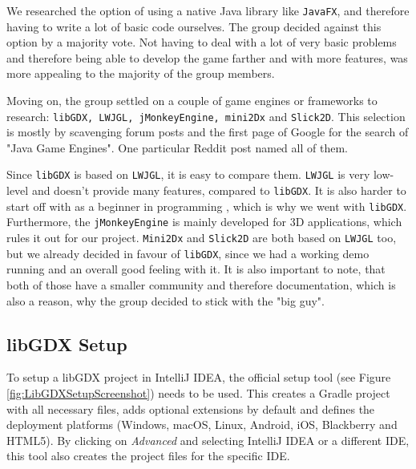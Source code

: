 \documentclass[12p]{article}
\begin{document}
We researched the option of using a native Java library like \texttt{JavaFX}, and therefore having to write a lot of basic code ourselves. The group decided against this option by a majority vote. Not having to deal with a lot of very basic problems and therefore being able to develop the game farther and with more features, was more appealing to the majority of the group members.

Moving on, the group settled on a couple of game engines or frameworks to research: \texttt{libGDX, LWJGL, jMonkeyEngine, mini2Dx} and \texttt{Slick2D}. This selection is mostly by scavenging forum posts and the first page of Google for the search of "Java Game Engines". One particular Reddit post \cite{RedditJavaGameEngines} named all of them.

Since \texttt{libGDX} is based on \texttt{LWJGL}, it is easy to compare them. \texttt{LWJGL} is very low-level and doesn't provide many features, compared to \texttt{libGDX}. It is also harder to start off with as a beginner in programming \cite{StackExchangeLibGDXLWJGL}, which is why we went with \texttt{libGDX}. Furthermore, the \texttt{jMonkeyEngine} is mainly developed for 3D applications, which rules it out for our project. \texttt{Mini2Dx} and \texttt{Slick2D} are both based on \texttt{LWJGL} too, but we already decided in favour of \texttt{libGDX}, since we had a working demo running and an overall good feeling with it. It is also important to note, that both of those have a smaller community and therefore documentation, which is also a reason, why the group decided to stick with the "big guy". 

\subsection{libGDX Setup}

To setup a libGDX project in IntelliJ IDEA, the official setup tool (see Figure \ref{fig:LibGDXSetupScreenshot}) needs to be used. This creates a Gradle project with all necessary files, adds optional extensions by default and defines the deployment platforms (Windows, macOS, Linux, Android, iOS, Blackberry and HTML5). By clicking on \emph{Advanced} and selecting IntelliJ IDEA or a different IDE, this tool also creates the project files for the specific IDE.
\end{document}
